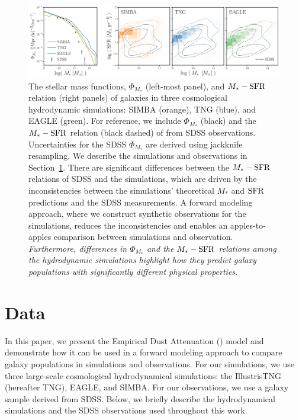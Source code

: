 \begin{figure}
\begin{center}
    \includegraphics[width=\textwidth]{figs/smf_m_sfr.pdf}
    \caption{\label{fig:smf_msfr}
    The stellar mass functions, $\Phi_{M_*}$ (left-most panel), and $M_*-{\rm SFR}$
    relation (right panels) of galaxies in three cosmological hydrodynamic 
    simulations: SIMBA (orange), TNG (blue), and EAGLE (green). 
    For reference, we include $\Phi_{M_*}$ (black) and the $M_*-{\rm SFR}$ relation 
    (black dashed) of from SDSS observations. Uncertainties for the 
    SDSS $\Phi_{M_*}$ are derived using jackknife resampling. We describe the
    simulations and observations in Section~\ref{sec:sims}. 
    There are significant differences between the $M_*-{\rm SFR}$ relations of
    SDSS and the simulations, which are driven by the inconsistencies
    between the simulations' theoretical $M_*$ and ${\rm SFR}$ predictions
    and the SDSS measurements.
    A forward modeling approach, where we construct synthetic observations
    for the simulations, reduces the inconsistencies and enables an
    apples-to-apples comparison between simulations and observation. 
    \emph{Furthermore, differences
    in $\Phi_{M_*}$ and the $M_*-{\rm SFR}$ relations among the hydrodynamic simulations 
    highlight how they predict galaxy populations with significantly different
    physical properties.} 
    }
\end{center}
\end{figure}

\section{Data}\label{sec:sims}
In this paper, we present the Empirical Dust Attenuation (\eda) model and
demonstrate how it can be used in a forward modeling approach to compare galaxy
populations in simulations and observations. For our simulations, we use three large-scale
cosmological hydrodynamical simulations: the IllustrisTNG (hereafter TNG),
EAGLE, and SIMBA. For our observations, we use a galaxy sample derived from
SDSS. Below, we briefly describe the hydrodynamical simulations and the SDSS
observations used throughout this work.

